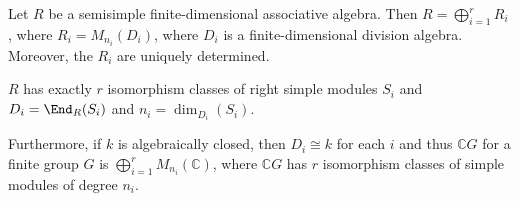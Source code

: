 Let $R$ be a semisimple finite-dimensional associative algebra. Then
$R = \bigoplus_{i = 1}^r R_i$, where $R_i = M_{n_i}(D_i)$, where $D_i$ is a
finite-dimensional division algebra. Moreover, the $R_i$ are uniquely determined.

$R$ has exactly $r$ isomorphism classes of right simple modules $S_i$ and
$D_i = \End_R(S_i)$ and $n_i = \dim_{D_i}(S_i)$.

Furthermore, if $k$ is algebraically closed, then $D_i \cong k$ for each $i$ and
thus $\mathbb{C}G$ for a finite group $G$ is $\bigoplus_{i=1}^r M_{n_i}(\mathbb{C})$,
where $\mathbb{C}G$ has $r$ isomorphism classes of simple modules of degree $n_i$.
